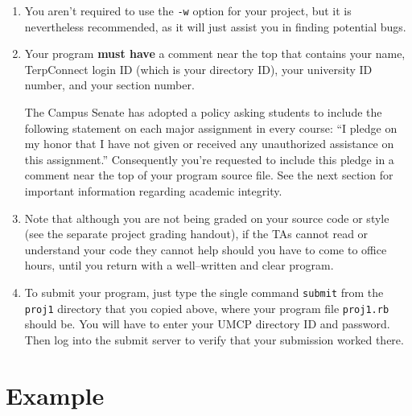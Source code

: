 \documentclass[11pt]{article}
\begin{document}
\begin{enumerate}
      \item You aren't required to use the \texttt{-w} option for your
            project, but it is nevertheless recommended, as it will just
            assist you in finding potential bugs.

      \item Your program \textbf{must have} a comment near the top that
            contains your name, TerpConnect login ID (which is your
            directory ID), your university ID number, and your section
            number.

            The Campus Senate has adopted a policy asking students to
            include the following statement on each major assignment in
            every course: ``I pledge on my honor that I have not given or
            received any unauthorized assistance on this assignment.''
            Consequently you're requested to include this pledge in a
            comment near the top of your program source file.  See the next
            section for important information regarding academic integrity.

      \item Note that although you are not being graded on your source code
            or style (see the separate project grading handout), if the TAs
            cannot read or understand your code they cannot help should you
            have to come to office hours, until you return with a
            well--written and clear program.

      \item To submit your program, just type the single command
            \texttt{submit} from the \texttt{proj1} directory that you
            copied above, where your program file \texttt{proj1.rb} should
            be.  You will have to enter your UMCP directory ID and password.
            Then log into the submit server to verify that your submission
            worked there.

    \end{enumerate}

    \vspace{-4.5mm}

  \section{Example}

    \vspace{-4.5mm}
\end{document}
